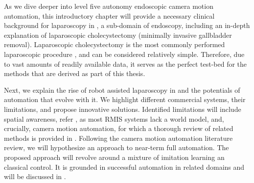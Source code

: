 As we dive deeper into level five autonomy endoscopic camera motion automation, this introductory chapter will provide a necessary clinical background for laparoscopy in , a sub-domain of endoscopy, including an in-depth explanation of laparoscopic cholecystectomy (minimally invasive gallbladder removal). Laparoscopic cholecystectomy is the most commonly performed laparoscopic procedure \cite{sheetz2020trends}, and can be considered relatively simple. Therefore, due to vast amounts of readily available data, it serves as the perfect test-bed for the methods that are derived as part of this thesis. 

Next, we explain the rise of robot assisted laparoscopy in  and the potentials of automation that evolve with it. We highlight different commercial systems, their limitations, and propose innovative solutions. Identified limitations will include spatial awareness, refer , as most RMIS systems lack a world model, and, crucially, camera motion automation, for which a thorough review of related methods is provided in . Following the camera motion automation literature review, we will hypothesize an approach to near-term full automation. The proposed approach will revolve around a mixture of imitation learning an classical control. It is grounded in successful automation in related domains and will be discussed in .

